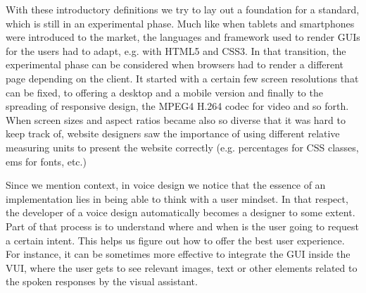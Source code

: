 %	
With these introductory definitions we try to lay out a foundation for a standard, which is still in an experimental phase. Much like when tablets and smartphones were introduced to the market, the languages and framework used to render GUIs for the users had to adapt, e.g. with HTML5 and CSS3. In that transition, the experimental phase can be considered when browsers had to render a different page depending on the client. It started with a certain few screen resolutions that can be fixed, to offering a desktop and a mobile version and finally to the spreading of responsive design, the MPEG4 H.264 codec for video and so forth. When screen sizes and aspect ratios became also so diverse that it was hard to keep track of, website designers saw the importance of using different relative measuring units to present the website correctly (e.g. percentages for CSS classes, ems for fonts, etc.)


Since we mention context, in voice design we notice that the essence of an implementation lies in being able to think with a user mindset. In that respect, the developer of a voice design automatically becomes a designer to some extent. Part of that process is to understand where and when is the user going to request a certain intent. This helps us figure out how to offer the best user experience. For instance, it can be sometimes more effective to integrate the GUI inside the VUI, where the user gets to see relevant images, text or other elements related to the spoken responses by the visual assistant.



